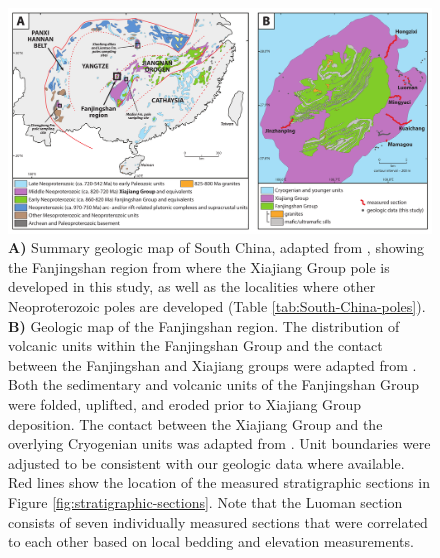 \begin{figure}[h!]
    \centering
    \includegraphics[width=1\textwidth]{figures/Xiajiang/geologic-maps.pdf}
    \caption[Geologic maps of South China and the Fanjingshan region.]{\textbf{A)} Summary geologic map of South China, adapted from \citet{Cawood2017a}, showing the Fanjingshan region from where the Xiajiang Group pole is developed in this study, as well as the localities where other Neoproterozoic poles are developed (Table \ref{tab:South-China-poles}). \textbf{B)} Geologic map of the Fanjingshan region. The distribution of volcanic units within the Fanjingshan Group and the contact between the Fanjingshan and Xiajiang groups were adapted from \citet{Wang2016c}. Both the sedimentary and volcanic units of the Fanjingshan Group were folded, uplifted, and eroded prior to Xiajiang Group deposition. The contact between the Xiajiang Group and the overlying Cryogenian units was adapted from \citet{Zhao2011a}. Unit boundaries were adjusted to be consistent with our geologic data where available. Red lines show the location of the measured stratigraphic sections in Figure \ref{fig:stratigraphic-sections}. Note that the Luoman section consists of seven individually measured sections that were correlated to each other based on local bedding and elevation measurements.}
    \label{fig:geologic-maps}
\end{figure}

